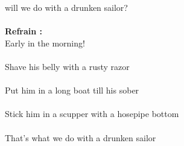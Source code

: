 
 will we do with a drunken sailor?
\\\\\textbf{Refrain :}
\\Early in the morning!
\\\\Shave his belly with a rusty razor
\\\\Put him in a long boat till his sober
\\\\Stick him in a scupper with a hosepipe bottom
\\\\That's what we do with a drunken sailor
\breakpage
